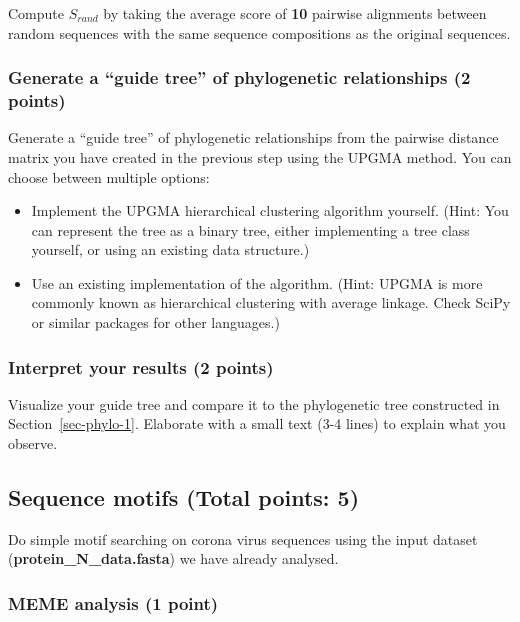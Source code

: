 \documentclass[
  a4paper,
  DIV=11,
  numbers=noendperiod]{scrartcl}
\providecommand{\tightlist}{%
  \setlength{\itemsep}{0pt}\setlength{\parskip}{0pt}}\usepackage{longtable,booktabs,array}
\begin{document}
Compute \(S_{rand}\) by taking the average score of \textbf{10} pairwise
alignments between random sequences with the same sequence compositions
as the original sequences.

\hypertarget{generate-a-guide-tree-of-phylogenetic-relationships-2-points}{%
\subsubsection{Generate a ``guide tree'' of phylogenetic relationships
(2
points)}\label{generate-a-guide-tree-of-phylogenetic-relationships-2-points}}

Generate a ``guide tree'' of phylogenetic relationships from the
pairwise distance matrix you have created in the previous step using the
UPGMA method. You can choose between multiple options:

\begin{itemize}
\tightlist
\item
  Implement the UPGMA hierarchical clustering algorithm yourself. (Hint:
  You can represent the tree as a binary tree, either implementing a
  tree class yourself, or using an existing data structure.)
\item
  Use an existing implementation of the algorithm. (Hint: UPGMA is more
  commonly known as hierarchical clustering with average linkage. Check
  SciPy or similar packages for other languages.)
\end{itemize}

\hypertarget{interpret-your-results-2-points}{%
\subsubsection{Interpret your results (2
points)}\label{interpret-your-results-2-points}}

Visualize your guide tree and compare it to the phylogenetic tree
constructed in Section~\ref{sec-phylo-1}. Elaborate with a small text
(3-4 lines) to explain what you observe.

\hypertarget{sequence-motifs-total-points-5}{%
\subsection{Sequence motifs (Total points:
5)}\label{sequence-motifs-total-points-5}}

Do simple motif searching on corona virus sequences using the input
dataset (\textbf{protein\_N\_data.fasta}) we have already analysed.

\hypertarget{meme-analysis-1-point}{%
\subsubsection{MEME analysis (1 point)}\label{meme-analysis-1-point}}
\end{document}
